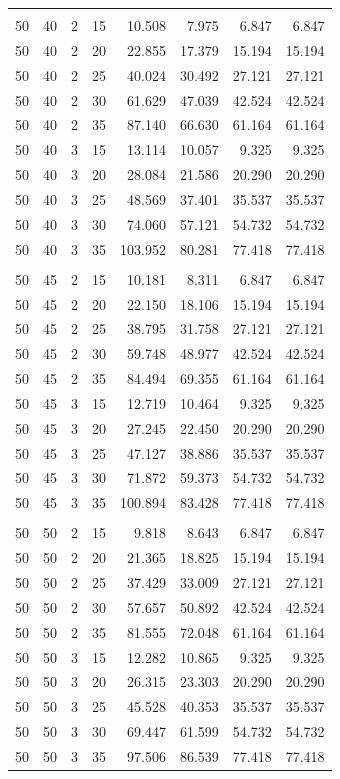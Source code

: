 \documentclass{article}
\begin{document}
\begin{longtable}{rrrrrrrr}
\addlinespace
\multicolumn{8}{l}{\textbf{$\theta_1=50^\circ$, $\theta_2=40^\circ$}} \\
50 & 40 & 2 & 15 & 10.508 & 7.975 & 6.847 & 6.847 \\
50 & 40 & 2 & 20 & 22.855 & 17.379 & 15.194 & 15.194 \\
50 & 40 & 2 & 25 & 40.024 & 30.492 & 27.121 & 27.121 \\
50 & 40 & 2 & 30 & 61.629 & 47.039 & 42.524 & 42.524 \\
50 & 40 & 2 & 35 & 87.140 & 66.630 & 61.164 & 61.164 \\
50 & 40 & 3 & 15 & 13.114 & 10.057 & 9.325 & 9.325 \\
50 & 40 & 3 & 20 & 28.084 & 21.586 & 20.290 & 20.290 \\
50 & 40 & 3 & 25 & 48.569 & 37.401 & 35.537 & 35.537 \\
50 & 40 & 3 & 30 & 74.060 & 57.121 & 54.732 & 54.732 \\
50 & 40 & 3 & 35 & 103.952 & 80.281 & 77.418 & 77.418 \\
\addlinespace
\multicolumn{8}{l}{\textbf{$\theta_1=50^\circ$, $\theta_2=45^\circ$}} \\
50 & 45 & 2 & 15 & 10.181 & 8.311 & 6.847 & 6.847 \\
50 & 45 & 2 & 20 & 22.150 & 18.106 & 15.194 & 15.194 \\
50 & 45 & 2 & 25 & 38.795 & 31.758 & 27.121 & 27.121 \\
50 & 45 & 2 & 30 & 59.748 & 48.977 & 42.524 & 42.524 \\
50 & 45 & 2 & 35 & 84.494 & 69.355 & 61.164 & 61.164 \\
50 & 45 & 3 & 15 & 12.719 & 10.464 & 9.325 & 9.325 \\
50 & 45 & 3 & 20 & 27.245 & 22.450 & 20.290 & 20.290 \\
50 & 45 & 3 & 25 & 47.127 & 38.886 & 35.537 & 35.537 \\
50 & 45 & 3 & 30 & 71.872 & 59.373 & 54.732 & 54.732 \\
50 & 45 & 3 & 35 & 100.894 & 83.428 & 77.418 & 77.418 \\
\addlinespace
\multicolumn{8}{l}{\textbf{$\theta_1=50^\circ$, $\theta_2=50^\circ$}} \\
50 & 50 & 2 & 15 & 9.818 & 8.643 & 6.847 & 6.847 \\
50 & 50 & 2 & 20 & 21.365 & 18.825 & 15.194 & 15.194 \\
50 & 50 & 2 & 25 & 37.429 & 33.009 & 27.121 & 27.121 \\
50 & 50 & 2 & 30 & 57.657 & 50.892 & 42.524 & 42.524 \\
50 & 50 & 2 & 35 & 81.555 & 72.048 & 61.164 & 61.164 \\
50 & 50 & 3 & 15 & 12.282 & 10.865 & 9.325 & 9.325 \\
50 & 50 & 3 & 20 & 26.315 & 23.303 & 20.290 & 20.290 \\
50 & 50 & 3 & 25 & 45.528 & 40.353 & 35.537 & 35.537 \\
50 & 50 & 3 & 30 & 69.447 & 61.599 & 54.732 & 54.732 \\
50 & 50 & 3 & 35 & 97.506 & 86.539 & 77.418 & 77.418 \\
\end{longtable}
\end{document}
